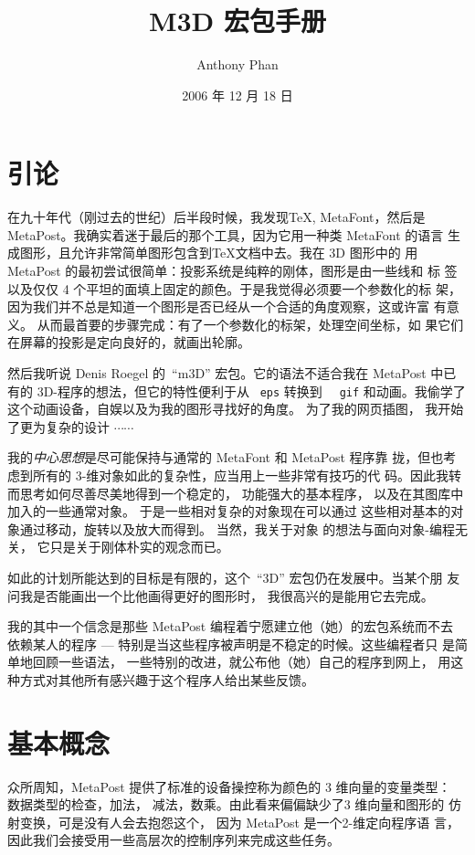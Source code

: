 \documentclass[a4paper,12pt]{article}
\begin{document}
 
\title{\Huge { M3D 宏包手册}}
\author{Anthony Phan }
\date{2006 年 12 月 18 日}
\maketitle
\section*{引论}
在九十年代（刚过去的世纪）后半段时候，我发现\TeX, MetaFont，然后是 
MetaPost。我确实着迷于最后的那个工具，因为它用一种类 MetaFont 的语言 
生成图形，且允许非常简单图形包含到\TeX 文档中去。我在 3D 图形中的 用 
MetaPost  的最初尝试很简单：投影系统是纯粹的刚体，图形是由一些线和 标
签以及仅仅 4 个平坦的面填上固定的颜色。于是我觉得必须要一个参数化的标 
架，因为我们并不总是知道一个图形是否已经从一个合适的角度观察，这或许富 
有意义。 从而最首要的步骤完成：有了一个参数化的标架，处理空间坐标，如 
果它们在屏幕的投影是定向良好的，就画出轮廓。 

然后我听说 Denis Roegel 的~``m3D'' 宏包。它的语法不适合我在 MetaPost
中已有的 3D-程序的想法，但它的特性便利于从 ~{\tt eps} 转换到 ~{\tt
  gif} 和动画。我偷学了这个动画设备，自娱以及为我的图形寻找好的角度。
为了我的网页插图， 我开始了更为复杂的设计 $\cdots\cdots$ 

我的{\it 中心思想}是尽可能保持与通常的  MetaFont 和  MetaPost 程序靠
拢，但也考虑到所有的 3-维对象如此的复杂性，应当用上一些非常有技巧的代 
码。因此我转而思考如何尽善尽美地得到一个稳定的， 功能强大的基本程序，
以及在其图库中加入的一些通常对象。 于是一些相对复杂的对象现在可以通过 
这些相对基本的对象通过移动，旋转以及放大而得到。 当然，我关于对象
的想法与面向对象-编程无关， 它只是关于刚体朴实的观念而已。

如此的计划所能达到的目标是有限的，这个~``3D'' 宏包仍在发展中。当某个朋 
友问我是否能画出一个比他画得更好的图形时， 我很高兴的是能用它去完成。

我的其中一个信念是那些 MetaPost 编程着宁愿建立他（她）的宏包系统而不去
依赖某人的程序 --- 特别是当这些程序被声明是不稳定的时候。这些编程者只
是简单地回顾一些语法， 一些特别的改进，就公布他（她）自己的程序到网上，
用这种方式对其他所有感兴趣于这个程序人给出某些反馈。

\section{基本概念}
众所周知，MetaPost 提供了标准的设备操控称为颜色的 3 维向量的变量类型：
数据类型的检查，加法， 减法，数乘。由此看来偏偏缺少了3 维向量和图形的
仿射变换，可是没有人会去抱怨这个， 因为 MetaPost 是一个2-维定向程序语
言，因此我们会接受用一些高层次的控制序列来完成这些任务。 
\end{document}
